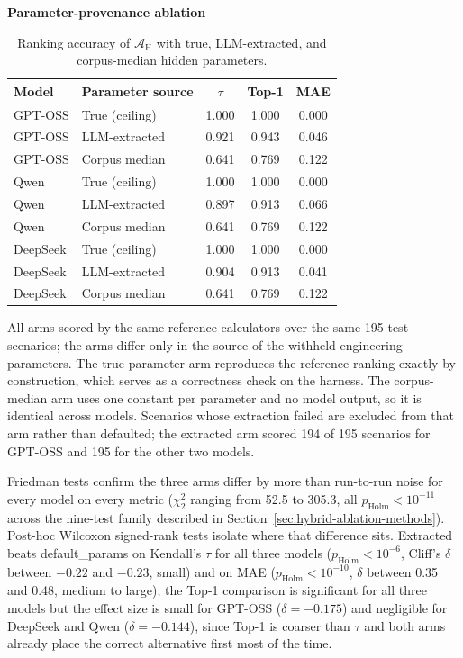\documentclass[a4paper,fleqn]{cas-dc}
\begin{document}
\begin{table}[htbp]
\begin{threeparttable}
\footnotesize
\centering
\textbf{Parameter-provenance ablation}
\renewcommand{\arraystretch}{1.15}
\begin{tabular}{llccc}
\toprule
Model & Parameter source & $\tau$ & Top-1 & MAE \\
\midrule
GPT-OSS & True (ceiling) & 1.000 & 1.000 & 0.000 \\
GPT-OSS & LLM-extracted & 0.921 & 0.943 & 0.046 \\
GPT-OSS & Corpus median & 0.641 & 0.769 & 0.122 \\
\midrule
Qwen & True (ceiling) & 1.000 & 1.000 & 0.000 \\
Qwen & LLM-extracted & 0.897 & 0.913 & 0.066 \\
Qwen & Corpus median & 0.641 & 0.769 & 0.122 \\
\midrule
DeepSeek & True (ceiling) & 1.000 & 1.000 & 0.000 \\
DeepSeek & LLM-extracted & 0.904 & 0.913 & 0.041 \\
DeepSeek & Corpus median & 0.641 & 0.769 & 0.122 \\
\bottomrule
\end{tabular}
\renewcommand{\arraystretch}{1.0}
\begin{tablenotes}
\item All arms scored by the same reference calculators over the same 195 test scenarios; the arms differ only in the source of the withheld engineering parameters. The true-parameter arm reproduces the reference ranking exactly by construction, which serves as a correctness check on the harness. The corpus-median arm uses one constant per parameter and no model output, so it is identical across models. Scenarios whose extraction failed are excluded from that arm rather than defaulted; the extracted arm scored 194 of 195 scenarios for GPT-OSS and 195 for the other two models.
\end{tablenotes}
\end{threeparttable}
\caption{Ranking accuracy of $\mathcal{A}_{\text{H}}$ with true, LLM-extracted, and corpus-median hidden parameters.}
\label{tab:param_provenance}
\end{table}

Friedman tests confirm the three arms differ by more than run-to-run noise for every model on every metric ($\chi^2_2$ ranging from 52.5 to 305.3, all $p_{\text{Holm}} < 10^{-11}$ across the nine-test family described in Section~\ref{sec:hybrid-ablation-methods}). Post-hoc Wilcoxon signed-rank tests isolate where that difference sits. Extracted beats default\_params on Kendall's $\tau$ for all three models ($p_{\text{Holm}} < 10^{-6}$, Cliff's $\delta$ between $-0.22$ and $-0.23$, small) and on MAE ($p_{\text{Holm}} < 10^{-10}$, $\delta$ between 0.35 and 0.48, medium to large); the Top-1 comparison is significant for all three models but the effect size is small for GPT-OSS ($\delta=-0.175$) and negligible for DeepSeek and Qwen ($\delta=-0.144$), since Top-1 is coarser than $\tau$ and both arms already place the correct alternative first most of the time.
\end{document}
